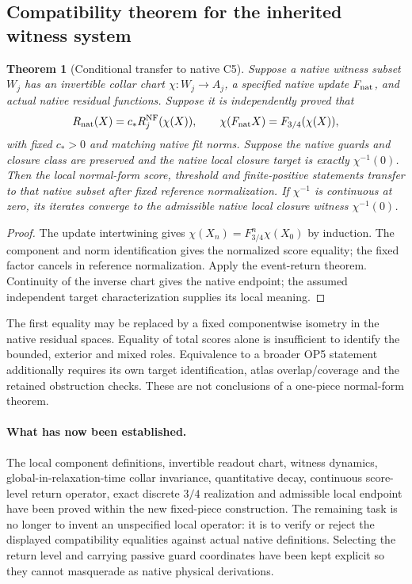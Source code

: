 \documentclass[11pt,a4paper]{article}
\newtheorem{theorem}{Theorem}
\begin{document}
\subsection{Compatibility theorem for the inherited witness system}
\begin{theorem}[Conditional transfer to native C5]
\label{thm:native-normal-form-compatibility}
Suppose a native witness subset $W_j$ has an invertible collar chart
$\chi:W_j\to A_j$, a specified native update $F_{\rm nat}$, and actual
native residual functions. Suppose it is independently proved that
\[
R_{\rm nat}(X)=c_*R_j^{\rm NF}(\chi(X)),\qquad
\chi(F_{\rm nat}X)=F_{3/4}(\chi(X)),
\]
with fixed $c_*>0$ and matching native fit norms. Suppose the native guards
and closure class are preserved and the native local closure target is
exactly $\chi^{-1}(0)$. Then the local normal-form score, threshold and
finite-positive statements transfer to that native subset after fixed
reference normalization. If $\chi^{-1}$ is continuous at zero, its iterates
converge to the admissible native local closure witness $\chi^{-1}(0)$.
\end{theorem}
\begin{proof}
The update intertwining gives $\chi(X_n)=F_{3/4}^n\chi(X_0)$ by induction.
The component and norm identification gives the normalized score equality;
the fixed factor cancels in reference normalization. Apply the event-return
theorem. Continuity of the inverse chart gives the native endpoint; the
assumed independent target characterization supplies its local meaning.
\end{proof}
The first equality may be replaced by a fixed componentwise isometry in
the native residual spaces. Equality of total scores alone is insufficient
to identify the bounded, exterior and mixed roles. Equivalence to a broader
OP5 statement additionally requires its own target identification, atlas
overlap/coverage and the retained obstruction checks. These are not
conclusions of a one-piece normal-form theorem.

\paragraph{What has now been established.}
The local component definitions, invertible readout chart, witness dynamics,
global-in-relaxation-time collar invariance, quantitative decay, continuous
score-level return operator, exact discrete $3/4$ realization and admissible
local endpoint have been proved within the new fixed-piece construction.
The remaining task is no longer to invent an unspecified local operator:
it is to verify or reject the displayed compatibility equalities against
actual native definitions. Selecting the return level and carrying passive
guard coordinates have been kept explicit so they cannot masquerade as
native physical derivations.
\end{document}
